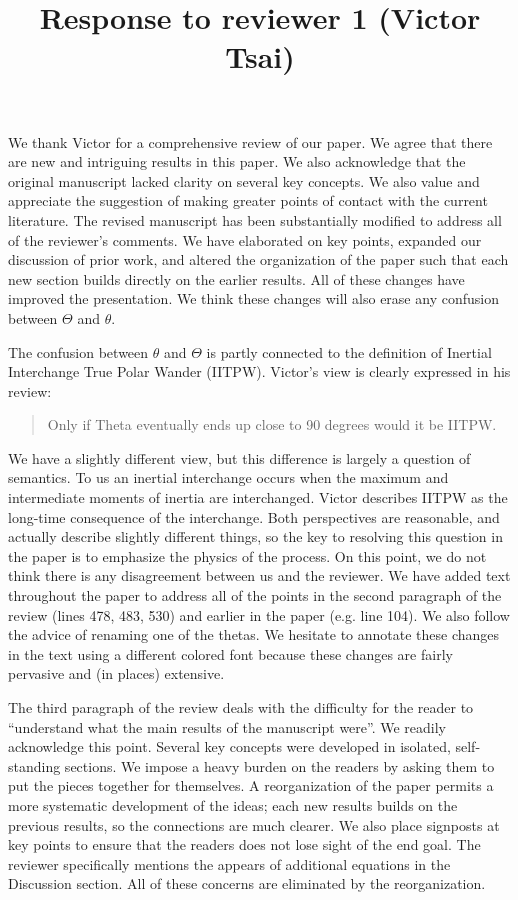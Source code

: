 \documentclass[a4paper,12pt]{article}
\title{Response to reviewer 1 (Victor Tsai)}
\author{}
\date{}
\begin{document}
\maketitle

We thank Victor for a comprehensive review of our paper. We agree that there are new and intriguing results in this paper.
We also acknowledge that the original manuscript lacked clarity on several key concepts.
We also value and appreciate the suggestion of making greater points of contact with the current literature.
The revised manuscript has been substantially modified to address all of the reviewer's comments.
We have elaborated on key points, expanded our discussion of prior work, and altered the organization of the paper such that each new section builds directly on the earlier results.
All of these changes have improved the presentation.
We think these changes will also erase any confusion between $\Theta$ and $\theta$.


The confusion between $\theta$ and $\Theta$ is partly connected to the definition of Inertial Interchange True Polar Wander (IITPW).
Victor's view is clearly expressed in his review:
\begin{quote}
Only if Theta eventually ends up close to 90 degrees would it be IITPW.
\end{quote}
We have a slightly different view, but this difference is largely a question of semantics.
To us an inertial interchange occurs when the maximum and intermediate moments of inertia are interchanged.
Victor describes IITPW as the long-time consequence of the interchange.
Both perspectives are reasonable, and actually describe slightly different things, so the key to resolving this question in the paper is to emphasize the physics of the process.
On this point, we do not think there is any disagreement between us and the reviewer.
We have added text throughout the paper to address all of the points in the second paragraph of the review (lines 478, 483, 530) and earlier in the paper (e.g. line 104).
We also follow the advice of renaming one of the thetas.
We hesitate to annotate these changes in the text using a different colored font because these changes are fairly pervasive and (in places) extensive.

The third paragraph of the review deals with the difficulty for the reader to ``understand what the main results of the manuscript were''.
We readily acknowledge this point.
Several key concepts were developed in isolated, self-standing sections.
We impose a heavy burden on the readers by asking them to put the pieces together for themselves.
A reorganization of the paper permits a more systematic development of the ideas; each new results builds on the previous results, so the connections are much clearer.
We also place signposts at key points to ensure that the readers does not lose sight of the end goal.
The reviewer specifically mentions the appears of additional equations in the Discussion section.
All of these concerns are eliminated by the reorganization.
\end{document}
